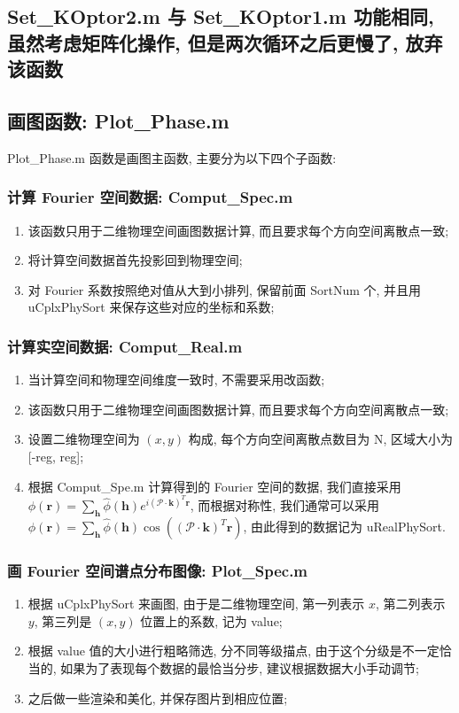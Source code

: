 \documentclass[12pt]{article}
\newcommand{\br}{\mathbf{r}}
\newcommand{\bk}{\mathbf{k}}
\newcommand{\bh}{\mathbf{h}}
\newcommand{\mcP}{\mathcal{P}}
\numberwithin{equation}{section}
\begin{document}
\begin{CJK}{UTF8}{gkai}
\subsection{Set\_KOptor2.m 与 Set\_KOptor1.m 功能相同, 虽然考虑矩阵化操作, 但是两次循环之后更慢了, 放弃该函数}


\subsection{画图函数: Plot\_Phase.m}
Plot\_Phase.m 函数是画图主函数, 主要分为以下四个子函数:

\subsubsection{计算 Fourier 空间数据: Comput\_Spec.m}
\begin{enumerate}[(1).]
	\item 该函数只用于二维物理空间画图数据计算, 而且要求每个方向空间离散点一致;
	\item 将计算空间数据首先投影回到物理空间;
	\item 对 Fourier 系数按照绝对值从大到小排列, 保留前面 SortNum 个, 并且用 uCplxPhySort 来保存这些对应的坐标和系数;
\end{enumerate}

\subsubsection{计算实空间数据: Comput\_Real.m}
\begin{enumerate}[(1).]
	\item 当计算空间和物理空间维度一致时, 不需要采用改函数;
	\item 该函数只用于二维物理空间画图数据计算, 而且要求每个方向空间离散点一致;
	\item 设置二维物理空间为 $ (x,y) $ 构成, 每个方向空间离散点数目为 N, 区域大小为 [-reg, reg];
	\item 根据 Comput\_Spe.m 计算得到的 Fourier 空间的数据, 我们直接采用 $ \phi(\br) = \sum_{\bh} \hat{\phi}(\bh) e^{ i (\mcP\cdot\bk)^{T} \br } $, 而根据对称性, 我们通常可以采用 $ \phi(\br) = \sum_{\bh} \hat{\phi}(\bh) \cos( (\mcP\cdot\bk)^{T} \br ) $, 由此得到的数据记为 uRealPhySort.
\end{enumerate}

\subsubsection{画 Fourier 空间谱点分布图像: Plot\_Spec.m}
\begin{enumerate}[(1).]
	\item 根据 uCplxPhySort 来画图, 由于是二维物理空间, 第一列表示 $x$, 第二列表示 $y$, 第三列是 $(x,y)$ 位置上的系数, 记为 value;
	\item 根据 value 值的大小进行粗略筛选, 分不同等级描点, 由于这个分级是不一定恰当的, 如果为了表现每个数据的最恰当分步, 建议根据数据大小手动调节;
	\item 之后做一些渲染和美化, 并保存图片到相应位置;
\end{enumerate}


\end{CJK}
\end{document}
